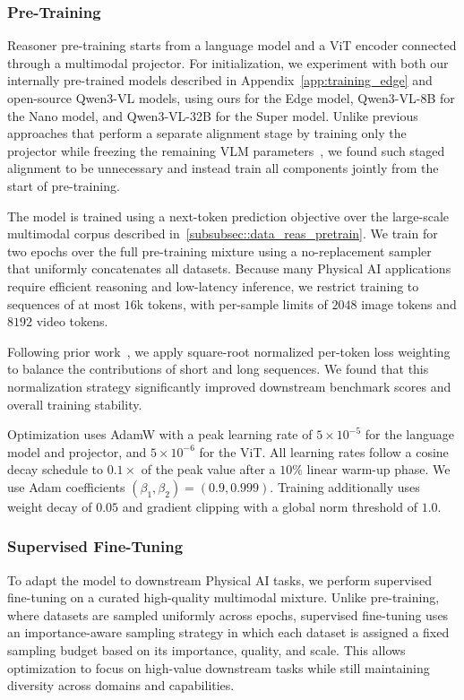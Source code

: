 \documentclass{llmxive}
\begin{document}
\subsubsection{Pre-Training}

Reasoner pre-training starts from a language model and a ViT encoder connected through a multimodal projector. For initialization, we experiment with both our internally pre-trained models described in Appendix~\ref{app:training_edge} and open-source Qwen3-VL models, using ours for the Edge model, Qwen3-VL-8B for the Nano model, and Qwen3-VL-32B for the Super model. Unlike previous approaches that perform a separate alignment stage by training only the projector while freezing the remaining VLM parameters~\citep{bai2025qwen3}, we found such staged alignment to be unnecessary and instead train all components jointly from the start of pre-training.

The model is trained using a next-token prediction objective over the large-scale multimodal corpus described in~\cref{subsubsec::data_reas_pretrain}. We train for two epochs over the full pre-training mixture using a no-replacement sampler that uniformly concatenates all datasets. Because many Physical AI applications require efficient reasoning and low-latency inference, we restrict training to sequences of at most $16$k tokens, with per-sample limits of $2048$ image tokens and $8192$ video tokens.

Following prior work~\citep{bai2025qwen3, wang2025internvl35}, we apply square-root normalized per-token loss weighting to balance the contributions of short and long sequences. We found that this normalization strategy significantly improved downstream benchmark scores and overall training stability.


Optimization uses AdamW with a peak learning rate of $5{\times}10^{-5}$ for the language model and projector, and $5{\times}10^{-6}$ for the ViT. All learning rates follow a cosine decay schedule to $0.1{\times}$ of the peak value after a $10\%$ linear warm-up phase. We use Adam coefficients $(\beta_1, \beta_2) = (0.9, 0.999)$. Training additionally uses weight decay of $0.05$ and gradient clipping with a global norm threshold of $1.0$.

\subsubsection{Supervised Fine-Tuning}

To adapt the model to downstream Physical AI tasks, we perform supervised fine-tuning on a curated high-quality multimodal mixture. Unlike pre-training, where datasets are sampled uniformly across epochs, supervised fine-tuning uses an importance-aware sampling strategy in which each dataset is assigned a fixed sampling budget based on its importance, quality, and scale. This allows optimization to focus on high-value downstream tasks while still maintaining diversity across domains and capabilities.
\end{document}
